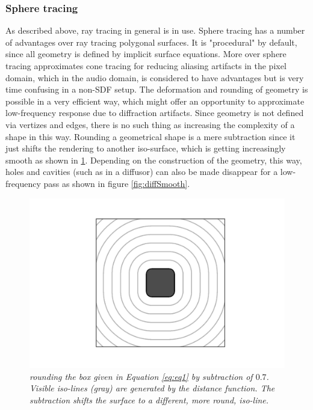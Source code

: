 \documentclass[twoside,a4paper]{article}
\begin{document}
\subsubsection{Sphere tracing}
As described above, ray tracing in general is in use. Sphere tracing has a number of advantages over ray tracing polygonal surfaces. It is "procedural" by default, since all geometry is defined by implicit surface equations. More over sphere tracing approximates cone tracing for reducing aliasing artifacts in the pixel domain\cite{hart_sphere_1996}, which in the audio domain, is considered to have advantages but is very time confusing in a non-SDF setup\cite{alpkocak_computing_2010}. The deformation and rounding of geometry is possible in a very efficient way, which might offer an opportunity to approximate low-frequency response due to diffraction artifacts. Since geometry is not defined via vertizes and edges, there is no such thing as increasing the complexity of a shape in this way. Rounding a geometrical shape is a mere subtraction since it just shifts the rendering to another iso-surface, which is getting increasingly smooth as shown in \ref{sdf_2d_box}. Depending on the construction of the geometry, this way, holes and cavities (such as in a diffusor) can also be made disappear for a low-frequency pass as shown in figure \ref{fig:diffSmooth}.

\begin{figure}[ht]
\centerline{\includegraphics[scale=0.6]{img/sdf2dbox.png}}
\caption{\label{sdf_2d_box}{\it rounding the box given in Equation \ref{eq:eq1} by subtraction of $0.7$. Visible iso-lines (gray) are generated by the distance function. The subtraction shifts the surface to a different, more round, iso-line.}}
\end{figure}  
\end{document}
